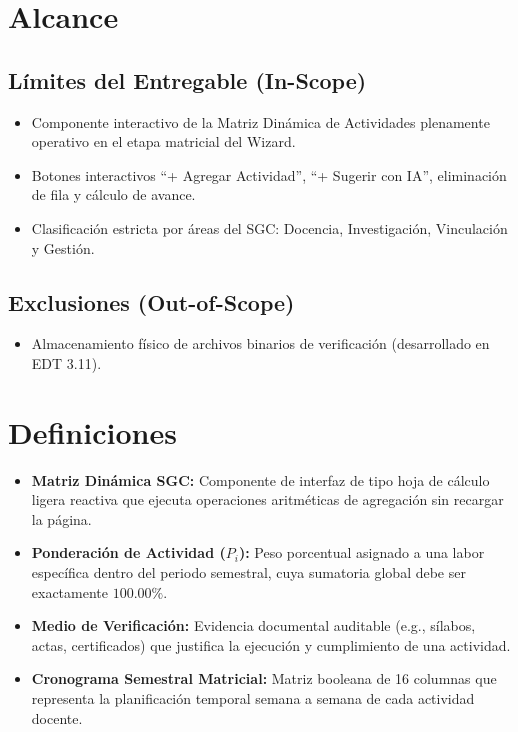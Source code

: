 \documentclass[12pt,a4paper]{article}
\begin{document}
\section{Alcance}
\subsection{Límites del Entregable (In-Scope)}
\begin{itemize}[leftmargin=1.5em, itemsep=2pt]
    \item Componente interactivo de la Matriz Dinámica de Actividades plenamente operativo en el etapa matricial del Wizard.
    \item Botones interactivos ``+ Agregar Actividad'', ``+ Sugerir con IA'', eliminación de fila y cálculo de avance.
    \item Clasificación estricta por áreas del SGC: Docencia, Investigación, Vinculación y Gestión.
\end{itemize}
\subsection{Exclusiones (Out-of-Scope)}
\begin{itemize}[leftmargin=1.5em, itemsep=2pt]
    \item Almacenamiento físico de archivos binarios de verificación (desarrollado en EDT 3.11).
\end{itemize}

\section{Definiciones}
\begin{itemize}[leftmargin=1.5em, itemsep=2pt]
    \item \textbf{Matriz Dinámica SGC:} Componente de interfaz de tipo hoja de cálculo ligera reactiva que ejecuta operaciones aritméticas de agregación sin recargar la página.
    \item \textbf{Ponderación de Actividad ($P_i$):} Peso porcentual asignado a una labor específica dentro del periodo semestral, cuya sumatoria global debe ser exactamente $100.00\%$.
    \item \textbf{Medio de Verificación:} Evidencia documental auditable (e.g., sílabos, actas, certificados) que justifica la ejecución y cumplimiento de una actividad.
    \item \textbf{Cronograma Semestral Matricial:} Matriz booleana de 16 columnas que representa la planificación temporal semana a semana de cada actividad docente.
\end{itemize}
\end{document}
